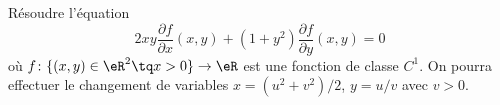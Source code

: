 \begin{exercice}\label{exoCalculDifferentiel0014}

 Résoudre l'équation
 \begin{equation}
2xy\displaystyle \frac{\partial f}{\partial x}(x,y) +(1+y^2)\displaystyle \frac{\partial f}{\partial y}(x,y) =0
 \end{equation}
où $f\colon\{ (x,y)\in \eR^2 \tq x>0 \} \to \eR $ est une fonction de classe $C^1$.  On pourra effectuer le changement de variables $x=(u^2+v^2)/2$, $ y=u/v$ avec $v>0$.

\end{exercice}
